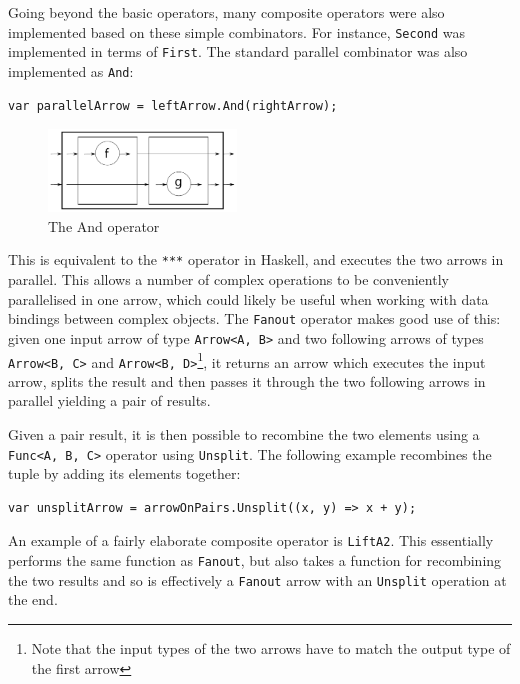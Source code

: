 \documentclass[12pt,twoside,notitlepage]{report}
\begin{document}
Going beyond the basic operators, many composite operators were also implemented based on these simple combinators. For instance, \texttt{Second} was implemented in terms of \texttt{First}. The standard parallel combinator was also implemented as \texttt{And}:

\begin{lstlisting}[language={[Sharp]C}]
var parallelArrow = leftArrow.And(rightArrow);
\end{lstlisting}

\begin{figure}[!ht]
  \centering
  \includegraphics[width=50mm]{fig/AndOperator.pdf}
  \caption{The And operator}
  \label{fig:and_operator}
\end{figure}

This is equivalent to the \texttt{***} operator in Haskell, and executes the two arrows in parallel. This allows a number of complex operations to be conveniently parallelised in one arrow, which could likely be useful when working with data bindings between complex objects. The \texttt{Fanout} operator makes good use of this: given one input arrow of type \texttt{Arrow<A, B>} and two following arrows of types \texttt{Arrow<B, C>} and \texttt{Arrow<B, D>}\footnote{Note that the input types of the two arrows have to match the output type of the first arrow}, it returns an arrow which executes the input arrow, splits the result and then passes it through the two following arrows in parallel yielding a pair of results.

Given a pair result, it is then possible to recombine the two elements using a \texttt{Func<A, B, C>} operator using \texttt{Unsplit}. The following example recombines the tuple by adding its elements together:

\begin{lstlisting}[language={[Sharp]C}]
var unsplitArrow = arrowOnPairs.Unsplit((x, y) => x + y);
\end{lstlisting}

An example of a fairly elaborate composite operator is \texttt{LiftA2}. This essentially performs the same function as \texttt{Fanout}, but also takes a function for recombining the two results and so is effectively a \texttt{Fanout} arrow with an \texttt{Unsplit} operation at the end.
\end{document}
